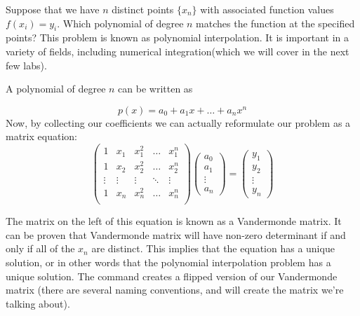 \label{lab:Barycentric}

Suppose that we have $n$ distinct points $\{x_n\}$ with associated function values $f(x_i) = y_i$. Which polynomial of degree $n$ matches the function at the specified points? This problem is known as polynomial interpolation. It is important in a variety of fields, including numerical integration(which we will cover in the next few labs).

A polynomial of degree $n$ can be written as

\[
p(x) = a_0 + a_1 x + \ldots + a_n x^n
\]
Now, by collecting our coefficients we can actually reformulate our problem as a matrix equation:
\[
\begin{pmatrix}
1 & x_1 & x_1^2 & \ldots & x_1^n \\
1 & x_2 & x_2^2 & \ldots & x_2^n \\
\vdots & \vdots & \vdots & \ddots & \vdots \\
1 & x_n & x_n^2 & \ldots & x_n^n \\
\end{pmatrix} \begin{pmatrix}
a_0 \\
a_1 \\
\vdots \\
a_n
\end{pmatrix} = \begin{pmatrix} y_1 \\ y_2 \\ \vdots \\ y_n \end{pmatrix}
\]

The matrix on the left of this equation is known as a Vandermonde matrix. It can be proven that Vandermonde matrix will have non-zero determinant if and only if  all of the $x_n$ are distinct. This implies that the equation has a unique solution, or in other words that the polynomial interpolation problem has a unique solution. The command  creates a flipped version of our Vandermonde matrix (there are several naming conventions, and  will create the matrix we're talking about).

